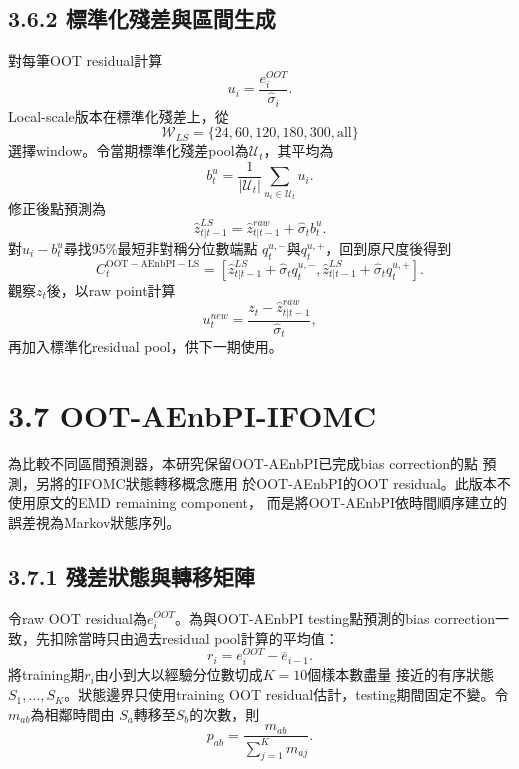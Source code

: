 \subsection*{3.6.2 標準化殘差與區間生成}

對每筆OOT residual計算
\begin{equation}
 u_i=\frac{e_i^{OOT}}{\widehat\sigma_i}.
\end{equation}
Local-scale版本在標準化殘差上，從
\begin{equation}
 \mathcal W_{LS}=\{24,60,120,180,300,\mathrm{all}\}
\end{equation}
選擇window。令當期標準化殘差pool為$\mathcal U_t$，其平均為
\begin{equation}
 b_t^u=\frac{1}{|\mathcal U_t|}\sum_{u_i\in\mathcal U_t}u_i.
\end{equation}
修正後點預測為
\begin{equation}
 \widehat z_{t|t-1}^{LS}
 =\widehat z_{t|t-1}^{raw}+\widehat\sigma_t b_t^u.
\end{equation}
對$u_i-b_t^u$尋找95\%最短非對稱分位數端點
$q_t^{u,-}$與$q_t^{u,+}$，回到原尺度後得到
\begin{equation}
 C_t^{\mathrm{OOT-AEnbPI-LS}}=\left[
 \widehat z_{t|t-1}^{LS}+\widehat\sigma_tq_t^{u,-},
 \widehat z_{t|t-1}^{LS}+\widehat\sigma_tq_t^{u,+}
 \right].
\end{equation}
觀察$z_t$後，以raw point計算
\begin{equation}
 u_t^{new}=\frac{z_t-\widehat z_{t|t-1}^{raw}}{\widehat\sigma_t},
\end{equation}
再加入標準化residual pool，供下一期使用。

\section*{3.7 OOT-AEnbPI-IFOMC}

為比較不同區間預測器，本研究保留OOT-AEnbPI已完成bias correction的點
預測，另將\cite{dingmeng2020}的IFOMC狀態轉移概念應用
於OOT-AEnbPI的OOT residual。此版本不使用原文的EMD remaining component，
而是將OOT-AEnbPI依時間順序建立的誤差視為Markov狀態序列。

\subsection*{3.7.1 殘差狀態與轉移矩陣}

令raw OOT residual為$e_i^{OOT}$。為與OOT-AEnbPI testing點預測的bias
correction一致，先扣除當時只由過去residual pool計算的平均值：
\begin{equation}
 r_i=e_i^{OOT}-\overline e_{i-1}.
\end{equation}
將training期$r_i$由小到大以經驗分位數切成$K=10$個樣本數盡量
接近的有序狀態$S_1,\ldots,S_K$。狀態邊界只使用training OOT
residual估計，testing期間固定不變。令$m_{ab}$為相鄰時間由
$S_a$轉移至$S_b$的次數，則
\begin{equation}
 p_{ab}=\frac{m_{ab}}{\sum_{j=1}^{K}m_{aj}}.
\end{equation}

